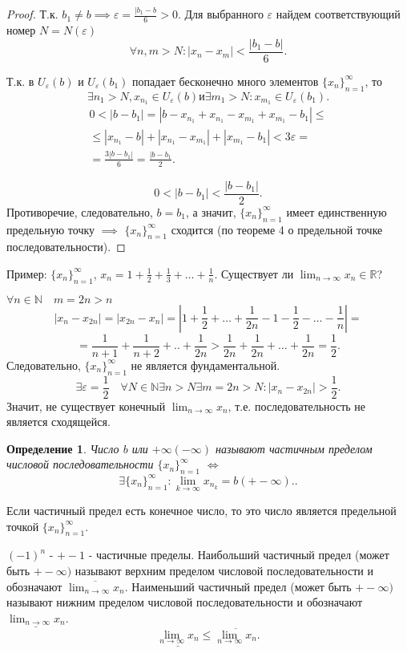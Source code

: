 \documentclass[a4paper,12pt]{article} %
\newtheorem{definition}{Определение}[subsection]
\theoremstyle{remark}
\begin{document}
\begin{proof}
Т.к. $b_1 \neq  b \implies \varepsilon = \frac{|b_1-b}{6} > 0.$ Для выбранного $\varepsilon$ найдем соответствующий номер $N=N(\varepsilon)$
\[
\forall n, m >N : |x_{n} - x_{m}| < \frac{|b_1-b|}{6}
.\] 

Т.к. в $U_\varepsilon(b)$ и $U_\varepsilon(b_1)$ попадает бесконечно много элементов $\{x_n\}_{n=1}^{\infty}$, то
\[
	\exists  n_1>N, x_{n_1} \in  U_\varepsilon(b) \text{и} \exists m_1>N : x_{m_1} \in U_\varepsilon(b_1)
.\] 
\begin{multline}
	0 < |b-b_1| = |b-x_{n_1} + x_{n_1} - x_{m_1} + x_{m_1} - b_1| \le \\
	\le |x_{n_1} - b| + |x_{n_1} - x_{m_1}| + |x_{m_1} - b_1| <3\varepsilon = \\
	= \frac{3|b-b_1|}{6} = \frac{|b-b_1}{2}.
\end{multline}
 
\[
0 < |b-b_1| < \frac{|b-b_1|}{2}
.\] 
Противоречие, следовательно, $b=b_1$, а значит, $\{x_n\}_{n=1}^{\infty}$ имеет единственную предельную точку $\implies$ $\{x_n\}_{n=1}^{\infty}$ сходится (по теореме 4 о предельной точке последовательности).
\end{proof}

Пример: $\{x_n\}_{n=1}^{\infty}$, $x_{n} = 1 + \frac{1}{2} + \frac{1}{3} + \ldots + \frac{1}{n}$. Существует ли $\lim_{n \to \infty} x_n \in  \mathbb{R}$?

$\forall n \in  \mathbb{N} \quad m = 2n > n$
\[
	|x_{n} - x_{2n}| = |x_{2n} - x_{n}| = |1 + \frac{1}{2} + \ldots + \frac{1}{2n} - 1 - \frac{1}{2} -\ldots - \frac{1}{n}| =
\] 
\[
= \frac{1}{n+1} + \frac{1}{n+2} + .. + \frac{1}{2n} > \frac{1}{2n} + \frac{1}{2n} + \ldots + \frac{1}{2n} = \frac{1}{2}
.\] 
Следовательно, $\{x_n\}_{n=1}^{\infty}$ не является фундаментальной.
\[
	\exists \varepsilon=\frac{1}{2} \quad \forall N\in  \mathbb{N} \exists n>N \exists m=2n>N : |x_{n}-x_{2n}| > \frac{1}{2}
.\] 
Значит, не существует конечный $\lim_{n \to \infty} x_n$, т.е. последовательность не является сходящейся.


\begin{definition}
	Число $b$ или $+\infty(-\infty)$ называют частичным пределом числовой последовательности $\{x_n\}_{n=1}^{\infty}$ $\iff$
	\[
		\exists  \{x_n\}_{n=1}^{\infty} : \lim_{k \to \infty} x_{n_k} = b (+-\infty).
	.\] 
\end{definition}
	Если частичный предел есть конечное число, то это число является предельной точкой $\{x_n\}_{n=1}^{\infty}$.

	$(-1)^{n}$ - $+-1$ - частичные пределы.
	Наибольший частичный предел (может быть $+-\infty)$ называют верхним пределом числовой последовательности и обозначают $\overline{\lim_{n \to \infty} x_n}$.
	Наименьший частичный предел (может быть $+-\infty)$ называют нижним пределом числовой последовательности и обозначают $\underline{\lim_{n \to \infty} x_n}$.
	\[
		\underline{\lim_{n \to \infty} x_n} \le \overline{\lim_{n \to \infty} x_n}
	.\] 
\end{document}
